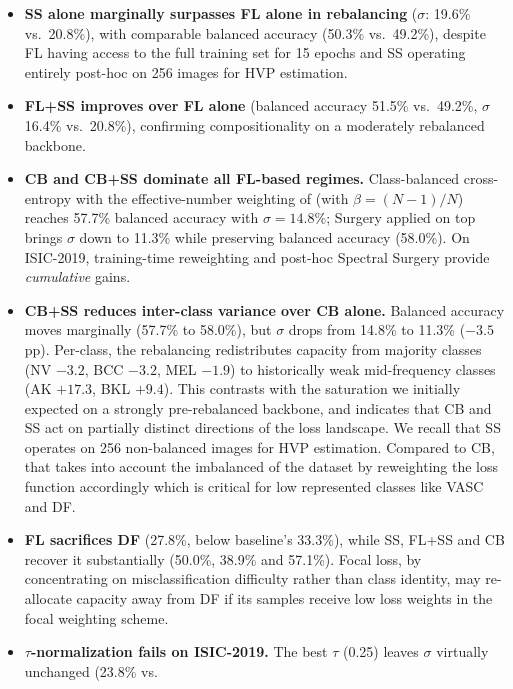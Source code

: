 \documentclass[11pt,a4paper]{article}
\begin{document}
\begin{itemize}
    \item \textbf{SS alone marginally surpasses FL alone in rebalancing}
      ($\sigma$: 19.6\% vs.\ 20.8\%), with comparable balanced accuracy
      (50.3\% vs.\ 49.2\%), despite FL having access to the full
      training set for 15 epochs and SS operating entirely post-hoc
      on 256 images for HVP estimation.
    \item \textbf{FL+SS improves over FL alone} (balanced accuracy
      51.5\% vs.\ 49.2\%, $\sigma$ 16.4\% vs.\ 20.8\%), confirming
      compositionality on a moderately rebalanced backbone.
    \item \textbf{CB and CB+SS dominate all FL-based regimes.}
      Class-balanced cross-entropy with the
      effective-number weighting of \cite{cui2019} (with
      $\beta=(N{-}1)/N$)
      reaches 57.7\% balanced accuracy with $\sigma=14.8\%$;
      Surgery applied on top brings $\sigma$ down to 11.3\% while
      preserving balanced accuracy (58.0\%). On ISIC-2019, training-time
      reweighting and post-hoc Spectral Surgery provide \emph{cumulative} gains.
    \item \textbf{CB+SS reduces inter-class variance over CB alone.}
      Balanced accuracy moves marginally (57.7\% to 58.0\%), but
      $\sigma$ drops from 14.8\% to 11.3\% ($-3.5$\,pp). Per-class,
      the rebalancing redistributes capacity from majority classes
      (NV $-3.2$, BCC $-3.2$, MEL $-1.9$) to historically weak
      mid-frequency classes (AK $+17.3$, BKL $+9.4$). This contrasts
      with the saturation we initially expected on a strongly
      pre-rebalanced backbone, and indicates that CB and SS act on
      partially distinct directions of the loss landscape. We recall that SS operates on 256 non-balanced images for HVP estimation. Compared to CB, that takes into account the imbalanced of the dataset by reweighting the loss function accordingly which is critical for low represented classes like VASC and DF.
    \item \textbf{FL sacrifices DF} (27.8\%, below baseline's 33.3\%),
      while SS, FL+SS and CB recover it substantially (50.0\%, 38.9\%
      and 57.1\%). Focal loss, by concentrating on misclassification
      difficulty rather than class identity, may re-allocate capacity
      away from DF if its samples receive low loss weights in the
      focal weighting scheme.
    \item \textbf{$\tau$-normalization fails on ISIC-2019.} The best
      $\tau$ (0.25) leaves $\sigma$ virtually unchanged (23.8\% vs.\

\end{itemize}
\end{document}
